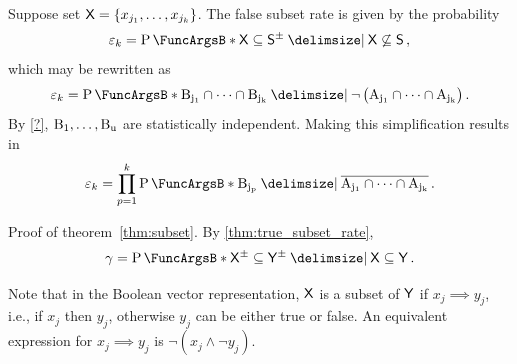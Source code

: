 \documentclass[11pt,final,hidelinks]{article}
\begin{document}



Suppose set $\Set{X} = \{x_{j_1},\ldots,x_{j_k}\}$. The false 
subset rate is given by the probability
\begin{equation}
\fprate_k = \Prob{\Set{X} \subseteq \ASet{S} \Given 
	\Set{X} \not\subseteq \Set{S}}\,,
\end{equation}
which may be rewritten as
\begin{equation}
\fprate_k = \Prob{\RV{B_{j_1}} \cap \cdots \cap \RV{B_{j_k}}
	\Given \neg \left(\RV{A_{j_1}} \cap \cdots \cap 
	\RV{A_{j_k}}\right)}\,.
\end{equation}
By \cref{?}, $\mathrm{B_1},\ldots,\mathrm{B_u}$ are statistically 
independent. Making this simplification results in
\begin{equation}
\fprate_k = \prod_{p=1}^{k} \Prob{\RV{B_{j_p}} \Given 
	\SetComplement[\RV{A_{j_1}} \cap \cdots \cap \RV{A_{j_k}}]}\,.
\end{equation}

Proof of theorem~\ref{thm:subset}.
By \cref{thm:true_subset_rate},
\begin{equation}
\tsr = \Prob{\ASet{X} \subseteq \ASet{Y} \Given \Set{X} \subseteq 
	\Set{Y}}\,.
\end{equation}

Note that in the Boolean vector representation, $\Set{X}$ is a subset of $\Set{Y}$ if $x_j \implies y_j$, i.e., if $x_j$ then $y_j$, otherwise $y_j$ can 
be either true or false.
An equivalent expression for $x_j \implies y_j$ is $\neg (x_j \land \neg y_j)$.
	
\end{document}
